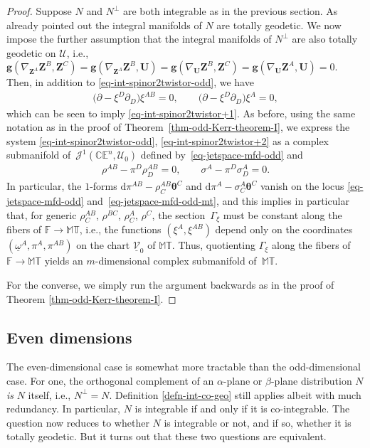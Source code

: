 \documentclass[pdftex]{sigma}
\numberwithin{equation}{section}
\newcommand{\mc} [1]{\mathcal{#1}}
\newcommand{\dd} {\mathrm{d}}
\newcommand{\T} {\mathbb{T}}
\newcommand{\E} {\mathbb{E}}
\newcommand{\M} {\mathbb{M}}
\newcommand{\C} {\mathbb{C}}
\newcommand{\F} {\mathbb{F}}
\begin{document}
\begin{proof}Suppose $N$ and $N^\perp$ are both integrable as in the previous section. As already pointed out the integral manifolds of $N$ are totally geodetic. We now impose the further assumption that the integral manifolds of $N^\perp$ are also totally geodetic on $\mc{U}$, i.e., $\bm{g} ( \nabla_{\bm{Z}^{A}} \bm{Z}^{B} , \bm{Z}^{C} ) = \bm{g} ( \nabla_{\bm{Z}^{A}} \bm{Z}^{B} , \bm{U} ) = \bm{g} ( \nabla_{\bm{U}} \bm{Z}^{B} , \bm{Z}^{C} ) = \bm{g} ( \nabla_{\bm{U}} \bm{Z}^{A} , \bm{U} ) = 0$. Then, in addition to \eqref{eq-int-spinor2twistor-odd}, we have
\begin{gather}\label{eq-int-spinor2twistor+2}
\big( \partial - \xi^{D} \partial _{D} \big) \xi^{AB} = 0 , \qquad \big( \partial - \xi^{D} \partial _{D} \big) \xi^{A} = 0 ,
\end{gather}
which can be seen to imply \eqref{eq-int-spinor2twistor+1}. As before, using the same notation as in the proof of Theorem~\ref{thm-odd-Kerr-theorem-I}, we express the system \eqref{eq-int-spinor2twistor-odd}, \eqref{eq-int-spinor2twistor+2} as a complex submanifold of~$\mc{J}^1(\C\E^n,\mc{U}_0)$ def\/ined by~\eqref{eq-jetspace-mfd-odd} and
\begin{gather}\label{eq-jetspace-mfd-odd-mt}
\rho^{AB} - \pi^{D} \rho_D^{AB} = 0 , \qquad \sigma^{A} - \pi^{D} \sigma _{D}^{A} = 0 .
\end{gather}
In particular, the $1$-forms $\dd \pi^{AB} - \rho_{C}^{AB} \bm{\theta}^C$ and $\dd \pi^{A} - \sigma_{C}^{A} \bm{\theta}^C$ vanish on the locus \eqref{eq-jetspace-mfd-odd} and~\eqref{eq-jetspace-mfd-odd-mt}, and this implies in particular that, for generic $\rho_{C}^{AB}$, $\rho^{BC}$, $\rho_{C}^{A}$, $\rho^{C}$, the section~$\Gamma_\xi$ must be constant along the f\/ibers of $\F \rightarrow \M\T$, i.e., the functions $(\xi^A,\xi^{AB})$ depend only on the coordinates $(\underline{\omega}^A,\pi^A,\pi^{AB})$ on the chart $\underline{\mc{V}}_0$ of $\M\T$. Thus, quotienting $\Gamma_\xi$ along the f\/ibers of $\F \rightarrow \M\T$ yields an $m$-dimensional complex submanifold of~$\M\T$.

For the converse, we simply run the argument backwards as in the proof of Theorem \ref{thm-odd-Kerr-theorem-I}.
\end{proof}

\subsection{Even dimensions}
The even-dimensional case is somewhat more tractable than the odd-dimensional case. For one, the orthogonal complement of an $\alpha$-plane or $\beta$-plane distribution $N$ \emph{is} $N$ itself, i.e., $N^\perp = N$. Def\/inition \ref{defn-int-co-geo} still applies albeit with much redundancy. In particular, $N$ is integrable if and only if it is co-integrable. The question now reduces to whether $N$ is integrable or not, and if so, whether it is totally geodetic. But it turns out that these two questions are equivalent.
\end{document}
